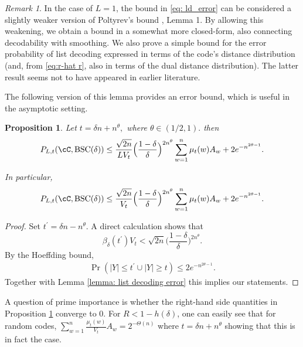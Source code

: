 \documentclass{amsart}
\newtheorem{proposition}[theorem]{Proposition}
\theoremstyle{remark}
\newtheorem{remark}{Remark}
\begin{document}
\begin{remark}
In the case of $L=1$, the bound in \eqref{eq: ld_error} can be considered a slightly weaker version of Poltyrev's bound \cite{poltyrev1994bounds}, Lemma 1. By allowing this weakening, we obtain a bound in
a somewhat more closed-form, also connecting decodability with smoothing. We also prove a simple bound for the error probability of list decoding expressed in terms of the code's distance distribution (and, from \eqref{eq:r-hat r}, also in terms of the dual distance distribution). The latter result seems not to have appeared in earlier literature.
\end{remark}

The following version of this lemma provides an error bound, which is useful in the asymptotic setting.  
\begin{proposition}  \label{prop: list decoding error - asymptotic}
Let $t = \delta n+ n^{\theta},$ where $\theta\in(1/2,1).$ then
\begin{align*} 
    P_{L,t}(\cC,{\text{\rm BSC}}(\delta)) \leq \frac{\sqrt{2n}}{L{V_t}}\Big(\frac{1-\delta}{\delta}\Big)^{2n^{\theta}}\sum_{w=1}^{n}{\mu_t(w)}A_w +2e^{-n^{2\theta-1}}.
\end{align*}

In particular,
\begin{align*} 
    P_{L,t}(\cC,{\text{\rm BSC}}(\delta)) \leq \frac{\sqrt{2n}}{V_t}\Big(\frac{1-\delta}{\delta}\Big)^{2n^{\theta}}\sum_{w=1}^{n}{\mu_t(w)}A_w +2e^{-n^{2\theta-1}}.
\end{align*}
\end{proposition} 

\begin{proof}
Set $t^{\prime} = \delta n -n^{\theta}$. A direct calculation shows that $$\beta_\delta(t^{\prime})V_t < {\sqrt{2n}}\Big(\frac{1-\delta}{\delta}\Big)^{2n^{\theta}}.$$
By the Hoeffding bound, 
\begin{align*}
   \Pr(|Y|\leq t^\prime \cup |Y|\geq t ) \le 2e^{-n^{2\theta-1}}.
\end{align*}
Together with Lemma \ref{lemma: list decoding error} this implies our statements.
\end{proof}

A question of prime importance is whether the right-hand side quantities in Proposition \ref{prop: list decoding error - asymptotic} converge to 0. For $R < 1-h(\delta)$, one can easily see that for random codes, $\sum_{w=1}^{n}\frac{\mu_t(w)}{V_t}A_w = 2^{-\Theta(n)}$ where $t = \delta n+ n^{\theta}$ showing that this is in fact the case. 
\end{document}
